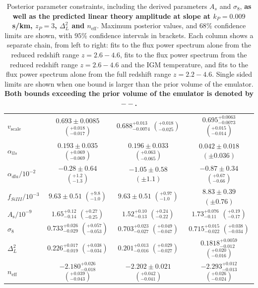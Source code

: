 \begin{table}
\begin{tabular} {| l | c | c | c|}
$v_\mathrm{scale}$ & $0.693\pm 0.0085$  $\left(^{+0.018}_{-0.017}\right)$    & $0.688^{+0.013}_{-0.0074}$  $\left(^{+0.018}_{-0.025}\right)$    & $0.695^{+0.0063}_{-0.0073}$  $\left(^{+0.015}_{-0.014} \right)$     \\
$\alpha_{lls}   $ & $0.193\pm 0.035$ $\left(^{+0.069}_{-0.069}\right)$          & $0.196\pm 0.033$  $\left(^{+0.063}_{-0.065}\right)   $     & $0.042\pm 0.018$  $\left(\pm 0.036\right)$   \\
$\alpha_{dla}/10^{-2}   $ & $-0.28\pm 0.64$ $\left(^{+1.2}_{-1.3}\right)$ & $-1.05\pm 0.58$ $\left(\pm 1.1\right)  $    & $-0.87\pm 0.34         $   $\left(^{+0.67}_{-0.66}\right)$  \\
$f_{SiIII}/10^{-3} $ & $9.63\pm 0.51$ $\left(^{+9.8}_{-1.0}\right)$              & $9.63\pm 0.51        $       $\left(^{+0.97}_{-1.0}\right) $          & $8.83\pm 0.39        $  $\left(\pm 0.76\right)$\\
\hline
$A_\mathrm{s}/10^{-9}      $ & $1.65^{+0.12}_{-0.14}$ $\left(^{+0.27}_{-0.25}\right)$ & $1.52^{+0.10}_{-0.13}$ $\left(^{+0.24}_{-0.22}\right)$  & $1.73^{+0.076}_{-0.11}$ $\left(^{+0.19}_{-0.17}\right)$   \\
$\sigma_8$ & $0.733^{+0.026}_{-0.029}$ $\left(^{+0.057}_{-0.053}\right)$ &  $0.703^{+0.023}_{-0.027}   $ $\left(^{+0.049}_{-0.047}\right)$ & $0.715^{+0.015}_{-0.022}$  $\left(^{+0.038}_{-0.034}\right)$  \\
$\Delta_L^2$     & $0.226^{+0.017}_{-0.019}$   $\left(^{+0.038}_{-0.034}\right)$ &  $0.201^{+0.013}_{-0.016}$    $\left(^{+0.029}_{-0.027}\right)$    & $0.1818^{+0.0059}_{-0.012} $ $\left(^{+0.020}_{-0.016}\right)$\\
$n_\mathrm{eff}$ & $-2.180^{+0.026}_{-0.018}$  $\left(^{+0.039}_{-0.043}\right)$ &  $-2.202\pm 0.021$     $\left(^{+0.042}_{-0.041}\right)$       & $-2.293^{+0.012}_{-0.013}  $ $\left(^{+0.026}_{-0.024}\right) $ \\
\hline
\end{tabular}
\caption{\label{table:parameters}
Posterior parameter constraints, including the derived parameters $A_s$ and $\sigma_8$, \textbf{as well as the predicted linear theory amplitude at slope at $k_P = 0.009$ s/km, $z_P=3$, $\Delta_L^2$ and $n_\mathrm{eff}$}.
Maximum posterior values, and $68\%$ confidence limits are shown, with $95\%$ confidence intervals in brackets.
Each column shows a separate chain, from left to right: fits to the flux power spectrum alone from the reduced redshift range $z=2.6 - 4.6$, fits to the flux power spectrum from the reduced redshift range $z=2.6 - 4.6$ and the IGM temperature, and fits to the flux power spectrum alone from the full redshift range $z=2.2 - 4.6$.
Single sided limits are shown when one bound is larger than the prior volume of the emulator. \textbf{Both bounds exceeding the prior volume of the emulator is denoted by $--$.}
}
\end{table}


